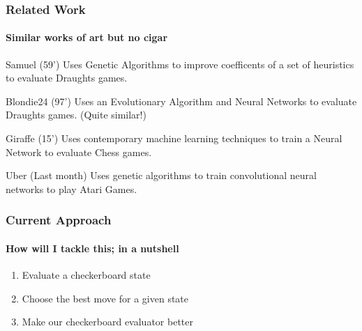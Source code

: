 \documentclass[aspectratio=169]{beamer}
\begin{document}
\begin{frame}
	\frametitle{Related Work}
	\framesubtitle{Similar works of art but no cigar}
	\begin{block}{Samuel (59')}
		Uses Genetic Algorithms to improve coefficents of a set of heuristics to evaluate Draughts games. \cite{samuel_studies_2000}
	\end{block}
	\begin{block}{Blondie24 (97')}
		Uses an Evolutionary Algorithm and Neural Networks to evaluate Draughts games. (Quite similar!) \cite{chellapilla_evolving_1999}
	\end{block}

	 \begin{block}{Giraffe (15')}
		Uses contemporary machine learning techniques to train a Neural Network to evaluate Chess games. \cite{lai_giraffe:_2015}
	 \end{block}

	 \begin{block}{Uber (Last month)}
		Uses genetic algorithms to train convolutional neural networks to play Atari Games. \cite{such_deep_2017}
	 \end{block}
\end{frame}

\begin{frame}
	\frametitle{Current Approach}
	\framesubtitle{How will I tackle this; in a nutshell}
	\begin{enumerate}
		\item Evaluate a checkerboard state
		\item Choose the best move for a given state
		\item Make our checkerboard evaluator better
	\end{enumerate}

\end{frame}
\end{document}
